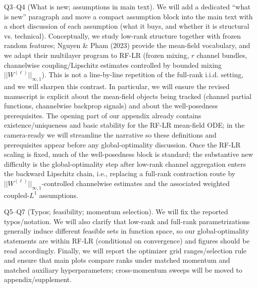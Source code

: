 Q3--Q4 (What is new; assumptions in main text). We will add a dedicated “what is new” paragraph and move a compact assumption block into the main text with a short discussion of each assumption (what it buys, and whether it is structural vs. technical). Conceptually, we study low-rank structure together with frozen random features; Nguyen & Pham (2023) provide the mean-field vocabulary, and we adapt their multilayer program to RF-LR (frozen mixing, $r$ channel bundles, channelwise coupling/Lipschitz estimates controlled by bounded mixing $||W^{(\ell)}||_{\infty,1}$). This is not a line-by-line repetition of the full-rank i.i.d. setting, and we will sharpen this contrast.
In particular, we will ensure the revised manuscript is explicit about the mean-field objects being tracked (channel partial functions, channelwise backprop signals) and about the well-posedness prerequisites. The opening part of our appendix already contains existence/uniqueness and basic stability for the RF-LR mean-field ODE; in the camera-ready we will streamline the narrative so these definitions and prerequisites appear before any global-optimality discussion. Once the RF-LR scaling is fixed, much of the well-posedness block is standard; the substantive new difficulty is the global-optimality step after low-rank channel aggregation enters the backward Lipschitz chain, i.e., replacing a full-rank contraction route by $||W^{(\ell)}||_{\infty,1}$-controlled channelwise estimates and the associated weighted coupled-$L^1$ assumptions.

Q5--Q7 (Typos; feasibility; momentum selection). We will fix the reported typos/notation. We will also clarify that low-rank and full-rank parametrizations generally induce different feasible sets in function space, so our global-optimality statements are within RF-LR (conditional on convergence) and figures should be read accordingly. Finally, we will report the optimizer grid ranges/selection rule and ensure that main plots compare ranks under matched momentum and matched auxiliary hyperparameters; cross-momentum sweeps will be moved to appendix/supplement.

